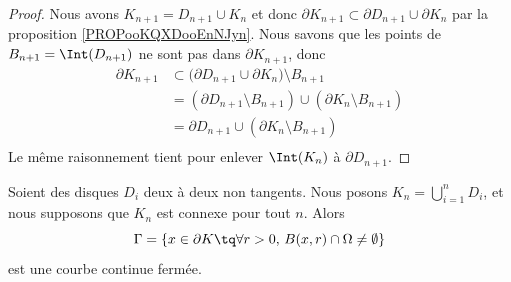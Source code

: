 \begin{proof}
	Nous avons \( K_{n+1}=D_{n+1}\cup K_n\) et donc \( \partial K_{n+1}\subset\partial D_{n+1}\cup\partial K_n\) par la proposition \ref{PROPooKQXDooEnNJyn}. Nous savons que les points de \( B_{n+1}=\Int(D_{n+1})\) ne sont pas dans \( \partial K_{n+1}\), donc
	\begin{subequations}
		\begin{align}
			\partial K_{n+1} & \subset\big( \partial D_{n+1}\cup\partial K_n\big)\setminus B_{n+1}     \\
			                 & =(\partial D_{n+1}\setminus B_{n+1})\cup(\partial K_n\setminus B_{n+1}) \\
			                 & =\partial D_{n+1}\cup(\partial K_n\setminus B_{n+1})                    \\
		\end{align}
	\end{subequations}
	Le même raisonnement tient pour enlever \( \Int(K_n)\) à \( \partial D_{n+1}\).
\end{proof}

\begin{proposition}	\label{PROPooXYNJooQGYgfw}
	Soient des disques \( D_i\) deux à deux non tangents. Nous posons \( K_n=\bigcup_{i=1}^nD_i\), et nous supposons que \( K_n\) est connexe pour tout \( n\). Alors
	\begin{equation}		\label{EQooPIMHooRYviBR}
		\Gamma=\{ x\in\partial K\tq \forall r>0,\,B(x,r)\cap\Omega\neq\emptyset \}
	\end{equation}
	est une courbe continue fermée.
\end{proposition}


